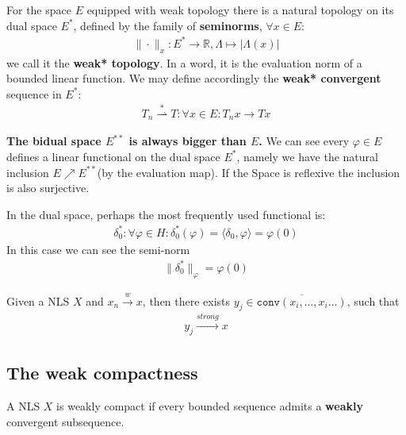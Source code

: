 \begin{definition}
For the space $E$ equipped with weak topology there is a natural topology on its dual space $E^*$, defined by the family of \textbf{seminorms}, $\forall x \in E$:
\begin{align*}
	  \| \cdot\|_x: E^* \rightarrow \mathbb{R},\Lambda \mapsto |\Lambda(x)| 
\end{align*}
we call it the \textbf{weak* topology}. In a word, it is the evaluation norm of a bounded linear function. We may define accordingly the \textbf{weak* convergent} sequence in $E^*$:
\begin{align*}
	T_n \overset{*}{\rightharpoonup} T: \forall x \in E: T_nx \rightarrow Tx
\end{align*}
\end{definition}
\begin{remark}
\textbf{The bidual space $E^{**}$ is always bigger than $E$.} We can see every $\varphi \in E$ defines a linear functional on the dual space $E^*$, namely we have the natural inclusion $E \nearrow E^{**}$(by the evaluation map). If the Space is reflexive the inclusion is also surjective.		
\end{remark}


\begin{example}	
In the dual space, perhaps the most frequently used functional is:
\begin{align*}
	\delta_0^* : \forall \varphi \in H: \delta_0^*(\varphi) =  \langle \delta_0, \varphi \rangle = \varphi(0)
\end{align*}
In this case we can see the semi-norm 
\begin{align*}
	\|\delta_0^*\|_{\varphi} = \varphi(0)
\end{align*}
\end{example}

\begin{theorem}
	Given a NLS $X$ and $x_n \overset{w}{\rightarrow} x$, then there exists $y_j \in \overline{\texttt{conv}(x_i, \dots, x_i \dots)}$, such that 
	\begin{align*}
		y_j \overset{strong}{\rightarrow} x
	\end{align*}
\end{theorem}

\subsection{The weak compactness}
\begin{definition}
	A NLS $X$ is weakly compact if every bounded sequence admits a \textbf{weakly} convergent subsequence.
\end{definition}

